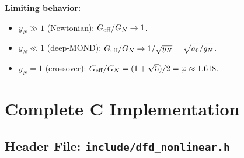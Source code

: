 \documentclass[11pt]{article}
\theoremstyle{definition}
\theoremstyle{remark}
\newcommand{\Geff}{G_{\rm eff}}
\begin{document}
\textbf{Limiting behavior:}
\begin{itemize}
\item $y_N \gg 1$ (Newtonian): $\Geff/G_N \to 1$.
\item $y_N \ll 1$ (deep-MOND): $\Geff/G_N \to 1/\sqrt{y_N} = \sqrt{a_0/g_N}$.
\item $y_N = 1$ (crossover): $\Geff/G_N = (1+\sqrt{5})/2 = \varphi \approx 1.618$.
\end{itemize}


\section{Complete C Implementation}
\label{sec:c-code}

\subsection{Header File: \texttt{include/dfd\_nonlinear.h}}
\end{document}
